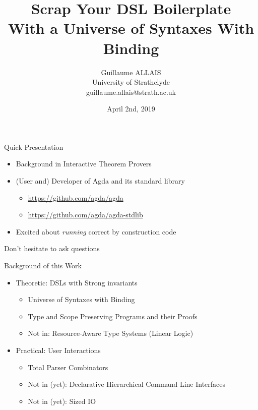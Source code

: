 \documentclass{beamer}
\begin{document}
\author{Guillaume ALLAIS
       \\ University of Strathclyde
       \\ guillaume.allais@strath.ac.uk}
\title{Scrap Your DSL Boilerplate\\
With a Universe of Syntaxes With Binding}
\date{April 2nd, 2019}

\begin{frame}
\maketitle
\end{frame}

\begin{frame}{Quick Presentation}
\begin{itemize}
  \item Background in Interactive Theorem Provers
  \item (User and) Developer of Agda and its standard library
    \begin{itemize}
      \item \url{https://github.com/agda/agda}
      \item \url{https://github.com/agda/agda-stdlib}
    \end{itemize}
  \item Excited about \emph{running} correct by construction code
\end{itemize}
\end{frame}

\begin{frame}{Don't hesitate to ask questions}
\end{frame}

\begin{frame}{Background of this Work}

\begin{itemize}
  \item Theoretic: DSLs with Strong invariants
    {
    \begin{itemize}
      \item Universe of Syntaxes with Binding
      \item Type and Scope Preserving Programs and their Proofs
      \item Not in: Resource-Aware Type Systems (Linear Logic)
    \end{itemize}
    }
  \medskip
  \item Practical: User Interactions
    {
    \begin{itemize}
      \item Total Parser Combinators
      \item Not in (yet): Declarative Hierarchical Command Line Interfaces
      \item Not in (yet): Sized IO
    \end{itemize}
    }
\end{itemize}
\end{frame}
\end{document}
